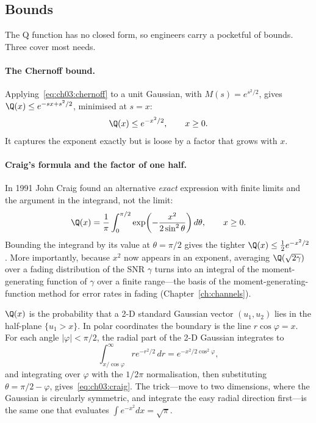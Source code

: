 \subsection{Bounds}

The Q function has no closed form, so engineers carry a pocketful of bounds. Three cover most
needs.

\paragraph{The Chernoff bound.} Applying~\eqref{eq:ch03:chernoff} to a unit Gaussian, with
$M(s)=e^{s^2/2}$, gives $\Q(x)\le e^{-sx+s^2/2}$, minimised at $s=x$:
\begin{equation}
\Q(x)\le e^{-x^2/2},\qquad x\ge0.
\end{equation}
It captures the exponent exactly but is loose by a factor that grows with $x$.

\paragraph{Craig's formula and the factor of one half.} In 1991 John Craig found an alternative
\emph{exact} expression with finite limits and the argument in the integrand, not the limit:
\begin{equation}
\Q(x)=\frac1\pi\int_0^{\pi/2}\exp\!\left(-\frac{x^2}{2\sin^2\theta}\right)d\theta,\qquad x\ge0.
\label{eq:ch03:craig}
\end{equation}
Bounding the integrand by its value at $\theta=\pi/2$ gives the tighter $\Q(x)\le\tfrac12e^{-x^2/2}$.
More importantly, because $x^2$ now appears in an exponent, averaging $\Q(\sqrt{2\gamma})$ over a
fading distribution of the SNR $\gamma$ turns into an integral of the moment-generating function of
$\gamma$ over a finite range---the basis of the moment-generating-function method for error rates in
fading (Chapter~\ref{ch:channels}).


\begin{deeper}
$\Q(x)$ is the probability that a 2-D standard Gaussian vector $(u_1,u_2)$ lies in the half-plane
$\{u_1>x\}$. In polar coordinates the boundary is the line $r\cos\varphi=x$. For each angle
$|\varphi|<\pi/2$, the radial part of the 2-D Gaussian integrates to
\[
\int_{x/\cos\varphi}^\infty re^{-r^2/2}\,dr=e^{-x^2/2\cos^2\varphi},
\]
and integrating over $\varphi$ with the $1/2\pi$ normalisation, then substituting
$\theta=\pi/2-\varphi$, gives~\eqref{eq:ch03:craig}. The trick---move to two dimensions, where the
Gaussian is circularly symmetric, and integrate the easy radial direction first---is the same one
that evaluates $\int e^{-x^2}dx=\sqrt\pi$.
\end{deeper}

